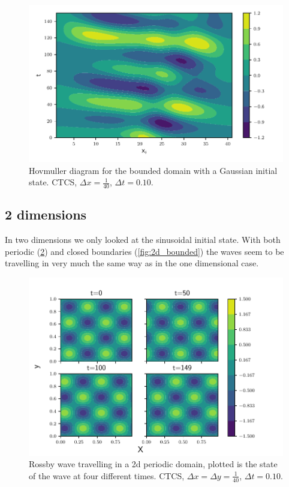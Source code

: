 \begin{figure}[H]
  \centering
  \includegraphics[width=\textwidth]{../figures/psi_bounded_centered_gauss.pdf}
  \caption{Hovmuller diagram for the bounded domain with a Gaussian initial state. CTCS, $\Delta x = \frac{1}{40}$, $\Delta t = 0.10$.}
  \label{fig:bounded_gauss}
\end{figure}


\subsection{2 dimensions}

In two dimensions we only looked at the sinusoidal initial state. With both
periodic (\cref{fig:2d_periodic}) and closed boundaries (\cref{fig:2d_bounded})
the waves seem to be travelling in very much the same way as in the one
dimensional case.

\begin{figure}[H]
  \centering
  \includegraphics[width=\textwidth]{../figures/periodic_2d.pdf}
  \caption{Rossby wave travelling in a 2d periodic domain, plotted is the state of the wave at four different times. CTCS, $\Delta x = \Delta y = \frac{1}{40}$, $\Delta t = 0.10$.}
  \label{fig:2d_periodic}
\end{figure}



